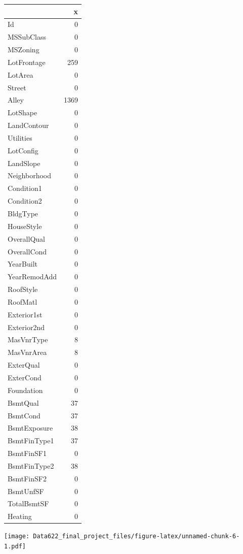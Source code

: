 \documentclass[
]{article}
\begin{document}
\begin{longtable}[]{@{}lr@{}}
\toprule
& x \\
\midrule
\endhead
Id & 0 \\
MSSubClass & 0 \\
MSZoning & 0 \\
LotFrontage & 259 \\
LotArea & 0 \\
Street & 0 \\
Alley & 1369 \\
LotShape & 0 \\
LandContour & 0 \\
Utilities & 0 \\
LotConfig & 0 \\
LandSlope & 0 \\
Neighborhood & 0 \\
Condition1 & 0 \\
Condition2 & 0 \\
BldgType & 0 \\
HouseStyle & 0 \\
OverallQual & 0 \\
OverallCond & 0 \\
YearBuilt & 0 \\
YearRemodAdd & 0 \\
RoofStyle & 0 \\
RoofMatl & 0 \\
Exterior1st & 0 \\
Exterior2nd & 0 \\
MasVnrType & 8 \\
MasVnrArea & 8 \\
ExterQual & 0 \\
ExterCond & 0 \\
Foundation & 0 \\
BsmtQual & 37 \\
BsmtCond & 37 \\
BsmtExposure & 38 \\
BsmtFinType1 & 37 \\
BsmtFinSF1 & 0 \\
BsmtFinType2 & 38 \\
BsmtFinSF2 & 0 \\
BsmtUnfSF & 0 \\
TotalBsmtSF & 0 \\
Heating & 0 \\
\bottomrule
\end{longtable}

\texttt{[image: Data622\_final\_project\_files/figure-latex/unnamed-chunk-6-1.pdf]}
\end{document}
